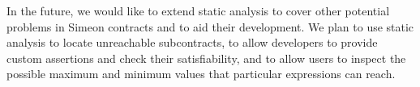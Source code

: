 \documentclass[english,runningheads]{llncs}
\begin{document}
In the future, we would like to extend static analysis to cover other
potential problems in Simeon contracts and to aid their development.
We plan to use static analysis to locate unreachable
subcontracts, to allow developers to provide custom assertions and
check their satisfiability, and to allow users to inspect the
possible maximum and minimum values that particular expressions can
reach. 




\end{document}
